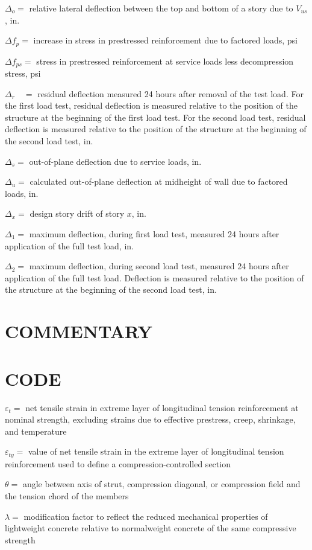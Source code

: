 \documentclass[10pt]{article}
\begin{document}
$\Delta_{o}=$ relative lateral deflection between the top and bottom of a story due to $V_{u s}$, in.

$\Delta f_{p}=$ increase in stress in prestressed reinforcement due to factored loads, psi

$\Delta f_{p s}=$ stress in prestressed reinforcement at service loads less decompression stress, psi

$\Delta_{r} \quad=$ residual deflection measured 24 hours after removal of the test load. For the first load test, residual deflection is measured relative to the position of the structure at the beginning of the first load test. For the second load test, residual deflection is measured relative to the position of the structure at the beginning of the second load test, in.

$\Delta_{s}=$ out-of-plane deflection due to service loads, in.

$\Delta_{u}=$ calculated out-of-plane deflection at midheight of wall due to factored loads, in.

$\Delta_{x}=$ design story drift of story $x$, in.

$\Delta_{1}=$ maximum deflection, during first load test, measured 24 hours after application of the full test load, in.

$\Delta_{2}=$ maximum deflection, during second load test, measured 24 hours after application of the full test load. Deflection is measured relative to the position of the structure at the beginning of the second load test, in.

\section*{COMMENTARY}
\section*{CODE}
$\varepsilon_{t}=$ net tensile strain in extreme layer of longitudinal tension reinforcement at nominal strength, excluding strains due to effective prestress, creep, shrinkage, and temperature

$\varepsilon_{t y}=$ value of net tensile strain in the extreme layer of longitudinal tension reinforcement used to define a compression-controlled section

$\theta=$ angle between axis of strut, compression diagonal, or compression field and the tension chord of the members

$\lambda=$ modification factor to reflect the reduced mechanical properties of lightweight concrete relative to normalweight concrete of the same compressive strength
\end{document}
